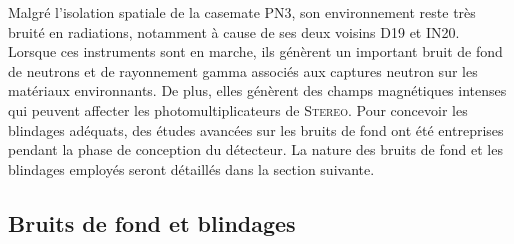 
Malgré l'isolation spatiale de la casemate PN3, son environnement reste très bruité en radiations, notamment à cause de ses deux voisins D19 et IN20. Lorsque ces instruments sont en marche, ils génèrent un important bruit de fond de neutrons et de rayonnement gamma associés aux captures neutron sur les matériaux environnants. De plus, elles génèrent des champs magnétiques intenses qui peuvent affecter les photomultiplicateurs de \textsc{Stereo}. Pour concevoir les blindages adéquats, des études avancées sur les bruits de fond ont été entreprises pendant la phase de conception du détecteur. La nature des bruits de fond et les blindages employés seront détaillés dans la section suivante.\\ 

\subsection{Bruits de fond et blindages} 

